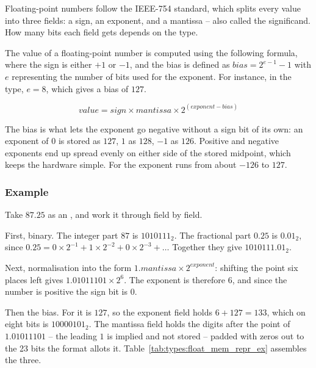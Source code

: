 Floating-point numbers follow the IEEE-754 standard, which splits every value
into three fields: a sign, an exponent, and a mantissa -- also called the
significand. How many bits each field gets depends on the type.



The value of a floating-point number is computed using the following formula,
where the sign is either $+1$ or $-1$, and the bias is defined as $bias =
2^{e-1} - 1$ with $e$ representing the number of bits used for the exponent. For
instance, in the  type, $e = 8$, which gives a bias of $127$.

\begin{equation*}
  value = sign \times mantissa \times 2^{(exponent - bias)}
\end{equation*}

The bias is what lets the exponent go negative without a sign bit of its own: an
exponent of $0$ is stored as $127$, $1$ as $128$, $-1$ as $126$. Positive and
negative exponents end up spread evenly on either side of the stored midpoint,
which keeps the hardware simple. For  the exponent runs from about
$-126$ to $127$.

\subsubsection{Example}

Take $87.25$ as an , and work it through field by field.

First, binary. The integer part $87$ is $1010111_2$. The fractional part $0.25$
is $0.01_2$, since $0.25 = 0 \times 2^{-1} + 1 \times 2^{-2} + 0 \times 2^{-3} +
\ldots$ Together they give $1010111.01_2$.

Next, normalisation into the form $1.mantissa \times 2^{exponent}$: shifting the
point six places left gives $1.01011101 \times 2^{6}$. The exponent is therefore
$6$, and since the number is positive the sign bit is $0$.

Then the bias. For  it is $127$, so the exponent field holds $6 + 127
= 133$, which on eight bits is $10000101_2$. The mantissa field holds the digits
after the point of $1.01011101$ -- the leading $1$ is implied and not stored --
padded with zeros out to the 23 bits the format allots it.
Table~\ref{tab:types:float_mem_repr_ex} assembles the three.


